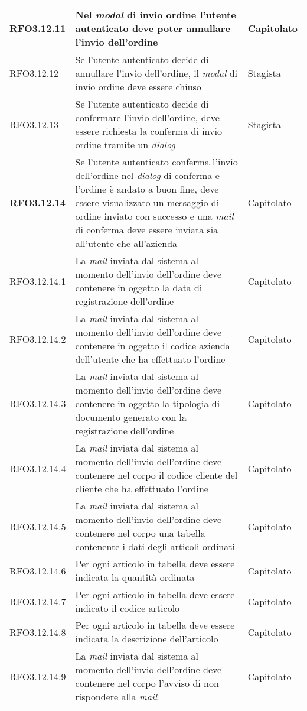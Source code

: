 {\begin{center}
\begin{longtable}{ | >{\centering\arraybackslash}p{2.5cm} | >{\arraybackslash}p{7cm} | >{\centering\arraybackslash}p{2cm} | }
RFO3.12.11 & Nel \textit{modal} di invio ordine l'utente autenticato deve poter annullare l'invio dell'ordine & Capitolato \\ \hline
RFO3.12.12 & Se l'utente autenticato decide di annullare l'invio dell'ordine, il \textit{modal} di invio ordine deve essere chiuso & Stagista \\ \hline
RFO3.12.13 & Se l'utente autenticato decide di confermare l'invio dell'ordine, deve essere richiesta la conferma di invio ordine tramite un \textit{dialog} & Stagista \\ \hline
\textbf{RFO3.12.14} & Se l'utente autenticato conferma l'invio dell'ordine nel \textit{dialog} di conferma e l'ordine è andato a buon fine, deve essere visualizzato un messaggio di ordine inviato con successo e una \textit{mail} di conferma deve essere inviata sia all'utente che all'azienda & Capitolato \\ \hline
RFO3.12.14.1 & La \textit{mail} inviata dal sistema al momento dell'invio dell'ordine deve contenere in oggetto la data di registrazione dell'ordine & Capitolato \\ \hline
RFO3.12.14.2 & La \textit{mail} inviata dal sistema al momento dell'invio dell'ordine deve contenere in oggetto il codice azienda dell'utente che ha effettuato l'ordine & Capitolato \\ \hline
RFO3.12.14.3 & La \textit{mail} inviata dal sistema al momento dell'invio dell'ordine deve contenere in oggetto la tipologia di documento generato con la registrazione dell'ordine & Capitolato \\ \hline
RFO3.12.14.4 & La \textit{mail} inviata dal sistema al momento dell'invio dell'ordine deve contenere nel corpo il codice cliente del cliente che ha effettuato l'ordine & Capitolato \\ \hline
RFO3.12.14.5 & La \textit{mail} inviata dal sistema al momento dell'invio dell'ordine deve contenere nel corpo una tabella contenente i dati degli articoli ordinati & Capitolato \\ \hline
RFO3.12.14.6 & Per ogni articolo in tabella deve essere indicata la quantità ordinata & Capitolato \\ \hline
RFO3.12.14.7 & Per ogni articolo in tabella deve essere indicato il codice articolo & Capitolato \\ \hline
RFO3.12.14.8 & Per ogni articolo in tabella deve essere indicata la descrizione dell'articolo & Capitolato \\ \hline
RFO3.12.14.9 & La \textit{mail} inviata dal sistema al momento dell'invio dell'ordine deve contenere nel corpo l'avviso di non rispondere alla \textit{mail} & Capitolato \\ \hline

\end{longtable}
\end{center}}
